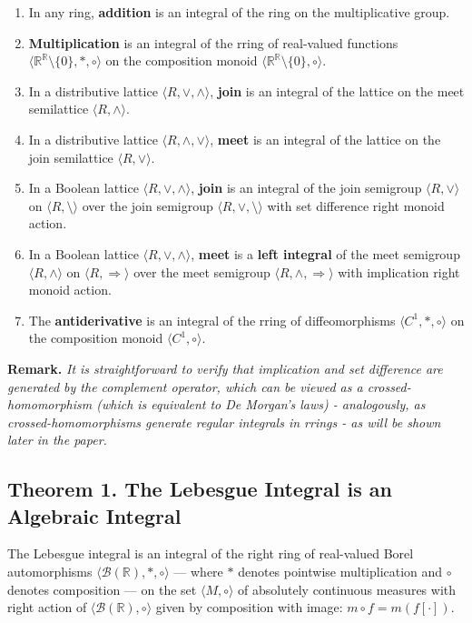\documentclass[12pt]{article}
\theoremstyle{definition}
\begin{document}
\begin{enumerate}
\item In any ring, \textbf{addition} is an integral of the ring on the multiplicative group.
\item \textbf{Multiplication} is an integral of the rring of real-valued functions $\langle \mathbb{R}^{\mathbb{R}}\setminus\{0\}, *, \circ \rangle$ on the composition monoid $\langle \mathbb{R}^{\mathbb{R}}\setminus\{0\}, \circ \rangle$. 
\item In a distributive lattice $\langle R, \vee, \wedge \rangle$, \textbf{join} is an integral of the lattice on the meet semilattice $\langle R, \wedge \rangle$.
\item In a distributive lattice $\langle R, \wedge, \vee  \rangle$, \textbf{meet} is an integral of the lattice on the join semilattice $\langle R, \vee \rangle$.
\item In a Boolean lattice $\langle R, \vee, \wedge \rangle$, \textbf{join} is an integral of the join semigroup $\langle R, \vee \rangle$ on $\langle R, \setminus \rangle$ over the join semigroup $\langle R, \vee, \setminus \rangle$ with set difference right monoid action.

\item In a Boolean lattice $\langle R, \vee, \wedge \rangle$, \textbf{meet} is a \textbf{left integral} of the meet semigroup $\langle R, \wedge \rangle$ on $\langle R, \Rightarrow \rangle$ over the meet semigroup $\langle R, \wedge, \Rightarrow \rangle$
with implication right monoid action.

\item The \textbf{antiderivative} is an integral of the rring of diffeomorphisms $\langle C^1, *, \circ \rangle$ on the composition monoid $\langle C^1, \circ \rangle$.
\end{enumerate}


\vspace{10pt}
\noindent\textbf{Remark.}\textit{
It is straightforward to verify that implication and set difference 
are generated by the complement operator, which can be viewed as 
a crossed-homomorphism (which is equivalent to De Morgan's laws) - analogously, as crossed-homomorphisms generate regular integrals in rrings - as will be shown later in the paper.
}

\vspace{10pt}
\subsection{Theorem 1. The Lebesgue Integral is an Algebraic Integral}
The Lebesgue integral is an integral of the right ring of real-valued Borel automorphisms $\langle \mathcal{B}(\mathbb{R}), *, \circ \rangle$ — where $*$ denotes pointwise multiplication and $\circ$ denotes composition — on the set $\langle M, \circ \rangle$ of absolutely continuous measures with right action of $\langle \mathcal{B}(\mathbb{R}), \circ \rangle$ given by composition with image: $m \circ f = m(f[\cdot])$.
\end{document}
